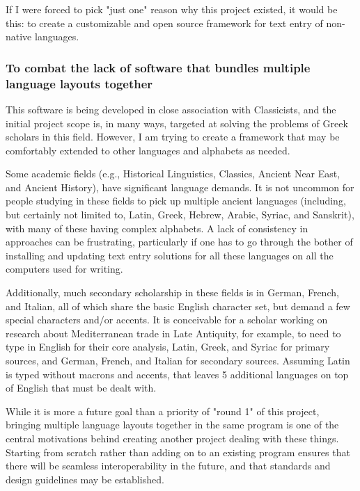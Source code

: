 \documentclass[11pt]{article}
\begin{document}
\begin{enumerate}
If I were forced to pick "just one" reason why this project existed, it would be this: to create a customizable and open source framework for text entry of non-native languages.
\end{enumerate}

\subsubsection{To combat the lack of software that bundles multiple language layouts together}
\label{sec:org3028107}

This software is being developed in close association with Classicists, and the initial project scope is, in many ways, targeted at solving the problems of Greek scholars in this field. However, I am trying to create a framework that may be comfortably extended to other languages and alphabets as needed.

Some academic fields (e.g., Historical Linguistics, Classics, Ancient Near East, and Ancient History), have significant language demands. It is not uncommon for people studying in these fields to pick up multiple ancient languages (including, but certainly not limited to, Latin, Greek, Hebrew, Arabic, Syriac, and Sanskrit), with many of these having complex alphabets. A lack of consistency in approaches can be frustrating, particularly if one has to go through the bother of installing and updating text entry solutions for all these languages on all the computers used for writing.

Additionally, much secondary scholarship in these fields is in German, French, and Italian, all of which share the basic English character set, but demand a few special characters and/or accents. It is conceivable for a scholar working on research about Mediterranean trade in Late Antiquity, for example, to need to type in English for their core analysis, Latin, Greek, and Syriac for primary sources, and German, French, and Italian for secondary sources. Assuming Latin is typed without macrons and accents, that leaves 5 additional languages on top of English that must be dealt with.

While it is more a future goal than a priority of "round 1" of this project, bringing multiple language layouts together in the same program is one of the central motivations behind creating another project dealing with these things. Starting from scratch rather than adding on to an existing program ensures that there will be seamless interoperability in the future, and that standards and design guidelines may be established.
\end{document}
